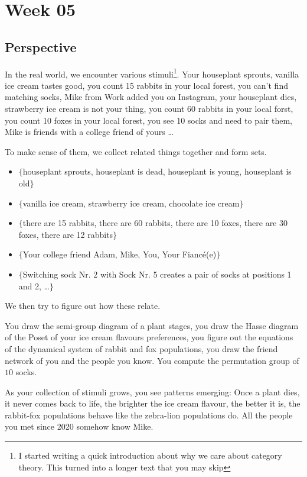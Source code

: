 \section{Week 05}

\subsection{Perspective}
\par{In the real world, we encounter various stimuli\footnote{I started writing a quick introduction about why we care about category theory. This turned into a longer text that you may skip}.
Your houseplant sprouts, vanilla ice cream tastes good, you count 15 rabbits in your local forest, you can't find matching socks, Mike from Work added you on Instagram, your houseplant dies, strawberry ice cream is not your thing, you count 60 rabbits in your local forst, you count 10 foxes in your local forest, you see 10 socks and need to pair them, Mike is friends with a college friend of yours \ldots}

\par{To make sense of them, we collect related things together and form sets.
\begin{itemize}
  \item $\{$houseplant sprouts, houseplant is dead, houseplant is young, houseplant is old$\}$
  \item $\{$vanilla ice cream, strawberry ice cream, chocolate ice cream$\}$
  \item $\{$there are 15 rabbits, there are 60 rabbits, there are 10 foxes, there are 30 foxes, there are 12 rabbits$\}$
  \item $\{$Your college friend Adam, Mike, You, Your Fiancé{(e)}$\}$
  \item $\{$Switching sock Nr. 2 with Sock Nr. 5 creates a pair of socks at positions 1 and 2, \ldots$\}$
\end{itemize}
We then try to figure out how these relate.}

\par{You draw the semi-group diagram of a plant stages, you draw the Hasse diagram of the Poset of your ice cream flavours preferences, you figure out the equations of the dynamical system of rabbit and fox populations, you draw the friend network of you and the people you know. You compute the permutation group of $10$ socks.}

\par{As your collection of stimuli grows, you see patterns emerging: Once a plant dies, it never comes back to life, the brighter the ice cream flavour, the better it is, the rabbit-fox populations behave like the zebra-lion populations do. All the people you met since 2020 somehow know Mike.}

